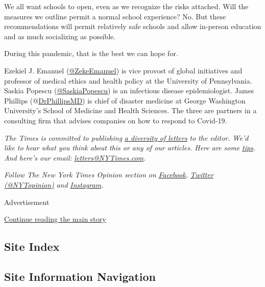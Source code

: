 We all want schools to open, even as we recognize the risks attached.
Will the measures we outline permit a normal school experience? No. But
these recommendations will permit relatively safe schools and allow
in-person education and as much socializing as possible.

During this pandemic, that is the best we can hope for.

Ezekiel J. Emanuel
(\href{https://twitter.com/zekeemanuel?lang=en}{@ZekeEmanuel}) is vice
provost of global initiatives and professor of medical ethics and health
policy at the University of Pennsylvania. Saskia Popescu
(\href{https://twitter.com/SaskiaPopescu?ref_src=twsrc\%5Egoogle\%7Ctwcamp\%5Eserp\%7Ctwgr\%5Eauthor}{@SaskiaPopescu})
is an infectious disease epidemiologist. James Phillips
(@\href{https://twitter.com/DrPhillipsMD}{DrPhillipsMD}) is chief of
disaster medicine at George Washington University's School of Medicine
and Health Sciences. The three are partners in a consulting firm that
advises companies on how to respond to Covid-19.

\emph{The Times is committed to publishing}
\href{https://www.nytimes3xbfgragh.onion/2019/01/31/opinion/letters/letters-to-editor-new-york-times-women.html}{\emph{a
diversity of letters}} \emph{to the editor. We'd like to hear what you
think about this or any of our articles. Here are some}
\href{https://help.nytimes3xbfgragh.onion/hc/en-us/articles/115014925288-How-to-submit-a-letter-to-the-editor}{\emph{tips}}\emph{.
And here's our email:}
\href{mailto:letters@NYTimes.com}{\emph{letters@NYTimes.com}}\emph{.}

\emph{Follow The New York Times Opinion section on}
\href{https://www.facebookcorewwwi.onion/nytopinion}{\emph{Facebook}}\emph{,}
\href{http://twitter.com/NYTOpinion}{\emph{Twitter (@NYTopinion)}}
\emph{and}
\href{https://www.instagram.com/nytopinion/}{\emph{Instagram}}\emph{.}

Advertisement

\protect\hyperlink{after-bottom}{Continue reading the main story}

\hypertarget{site-index}{%
\subsection{Site Index}\label{site-index}}

\hypertarget{site-information-navigation}{%
\subsection{Site Information
Navigation}\label{site-information-navigation}}

